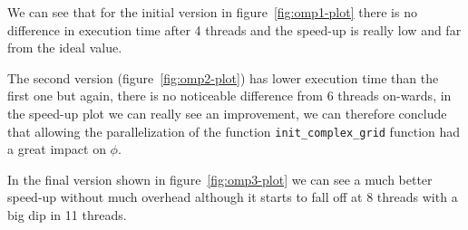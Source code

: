 We can see that for the initial version in figure~\ref{fig:omp1-plot} there is no difference in execution time 
after 4 threads and the speed-up is really low and far from the ideal value.

The second version (figure~\ref{fig:omp2-plot}) has lower execution
time than the first one but again, there is no noticeable difference from 6 threads on-wards, in the speed-up plot we can really see an improvement, we can therefore conclude that allowing the parallelization of the function \texttt{init\_complex\_grid} function had a great impact on $\phi$.

In the final version
shown in figure~\ref{fig:omp3-plot} we can see a much better speed-up without much overhead although it starts to
fall off at 8 threads with a big dip in 11 threads.


